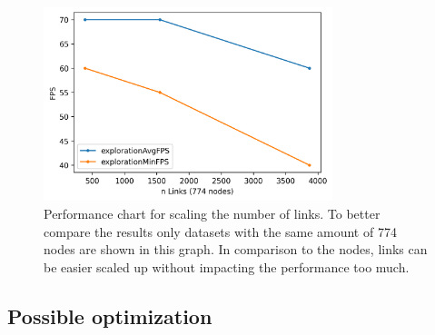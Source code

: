 \begin{figure}[!hbt]
    \centering
    \includegraphics[width=0.75\textwidth]{graphics/performanceAnalysisLinks2.png}
    \caption[Performance chart for scaling the number of links.]{Performance chart for scaling the number of links. To better compare the results only datasets with the same amount of 774 nodes are shown in this graph. In comparison to the nodes, links can be easier scaled up without impacting the performance too much.} 
    \label{fig:performanceLinks} 
\end{figure}

\subsection{Possible optimization}

